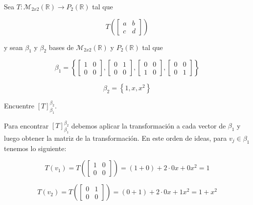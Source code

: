 \documentclass{report}
\begin{document}
    \begin{Example}
        Sea $T: \mathcal{M}_{2x2}(\mathbb{R}) \to P_2(\mathbb{R})$ tal que

        $$T\left(\begin{bmatrix}
            a & b \\
            c & d
        \end{bmatrix}\right)$$

        y sean $\beta_1$ y $\beta_2$ bases de $\mathcal{M}_{2x2}(\mathbb{R})$ y $P_2(\mathbb{R})$ tal que

        $$\beta_1 = \left\{
            \begin{bmatrix}
                1 & 0 \\
                0 & 0
            \end{bmatrix},
            \begin{bmatrix}
                0 & 1 \\
                0 & 0
            \end{bmatrix},
            \begin{bmatrix}
                0 & 0 \\
                1 & 0
            \end{bmatrix},
            \begin{bmatrix}
                0 & 0 \\
                0 & 1
            \end{bmatrix}
        \right\}$$

        $$\beta_2 = \left\{1, x, x^2\right\}$$

        Encuentre $[T]_{\beta_1}^{\beta_2}$.

        Para encontrar $[T]_{\beta_1}^{\beta_2}$ debemos aplicar la transformación a cada vector de $\beta_1$ y luego obtener la matriz de la transformación. En este orden de ideas, para $v_j \in \beta_1$ tenemos lo siguiente:

        $$T(v_1) = T \left(\begin{bmatrix}
            1 & 0 \\
            0 & 0
        \end{bmatrix}\right) = (1 + 0) + 2\cdot 0x + 0x^2 = 1$$

        $$T(v_2) = T \left(\begin{bmatrix}
            0 & 1 \\
            0 & 0
        \end{bmatrix}\right) = (0 + 1) + 2\cdot 0x + 1x^2 = 1 + x^2$$


\end{Example}
\end{document}
